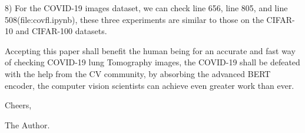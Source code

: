 \documentclass[10pt,twocolumn,letterpaper]{article}
\begin{document}
8) For the COVID-19 images dataset, we can check line 656, line 805, and line 508(file:covfl.ipynb), these three experiments are similar to those on the CIFAR-10 and CIFAR-100 datasets.

Accepting this paper shall benefit the human being for an accurate and fast way of checking COVID-19 lung Tomography images, the COVID-19 shall be defeated with the help from the CV community,
by absorbing the advanced BERT encoder, the computer vision scientists can achieve even greater work than ever.


Cheers,

The Author.

{\small

%
}
\end{document}
